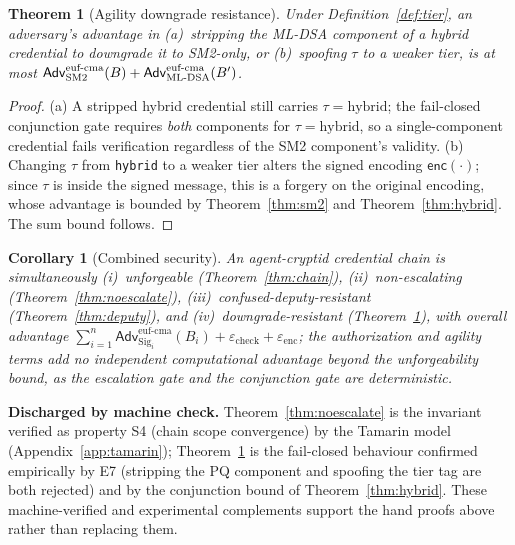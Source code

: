 \documentclass[10pt,twocolumn]{IEEEtran}
\newtheorem{theorem}{Theorem}
\newtheorem{corollary}{Corollary}
\begin{document}
\begin{theorem}[Agility downgrade resistance]
  \label{thm:downgrade}
  Under Definition~\ref{def:tier}, an adversary's advantage in
  (a)~stripping the ML-DSA component of a hybrid credential to downgrade
  it to SM2-only, or (b)~spoofing $\tau$ to a weaker tier, is at most
  $\mathsf{Adv}^{\text{euf-cma}}_{\text{SM2}}(B) +
  \mathsf{Adv}^{\text{euf-cma}}_{\text{ML\text{-}DSA}}(B')$.
\end{theorem}

\begin{proof}
  (a) A stripped hybrid credential still carries $\tau = \text{hybrid}$;
  the fail-closed conjunction gate requires \emph{both} components for
  $\tau = \text{hybrid}$, so a single-component credential fails
  verification regardless of the SM2 component's validity. (b) Changing
  $\tau$ from \texttt{hybrid} to a weaker tier alters the signed encoding
  $\mathsf{enc}(\cdot)$; since $\tau$ is inside the signed message, this
  is a forgery on the original encoding, whose advantage is bounded by
  Theorem~\ref{thm:sm2} and Theorem~\ref{thm:hybrid}. The sum bound
  follows.
\end{proof}

\begin{corollary}[Combined security]
  \label{cor:combined}
  An agent-cryptid credential chain is simultaneously (i)~unforgeable
  (Theorem~\ref{thm:chain}), (ii)~non-escalating
  (Theorem~\ref{thm:noescalate}), (iii)~confused-deputy-resistant
  (Theorem~\ref{thm:deputy}), and (iv)~downgrade-resistant
  (Theorem~\ref{thm:downgrade}), with overall advantage
  $\sum_{i=1}^{n} \mathsf{Adv}^{\text{euf-cma}}_{\text{Sig}_i}(B_i) +
  \varepsilon_{\text{check}} + \varepsilon_{\text{enc}}$; the
  authorization and agility terms add no independent computational
  advantage beyond the unforgeability bound, as the escalation gate and
  the conjunction gate are deterministic.
\end{corollary}

\noindent\textbf{Discharged by machine check.}
Theorem~\ref{thm:noescalate} is the invariant verified as property S4
(chain scope convergence) by the Tamarin model
(Appendix~\ref{app:tamarin}); Theorem~\ref{thm:downgrade} is the
fail-closed behaviour confirmed empirically by E7 (stripping the PQ
component and spoofing the tier tag are both rejected) and by the
conjunction bound of Theorem~\ref{thm:hybrid}. These machine-verified and
experimental complements support the hand proofs above rather than
replacing them.
\end{document}
